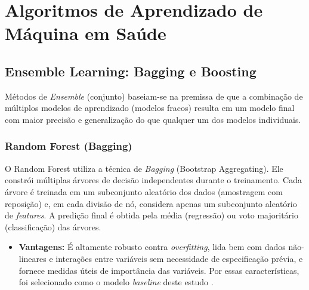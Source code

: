 \documentclass[12pt, a4paper]{report}
\begin{document}
\section{Algoritmos de Aprendizado de Máquina em Saúde}

\subsection{Ensemble Learning: Bagging e Boosting}
Métodos de \textit{Ensemble} (conjunto) baseiam-se na premissa de que a combinação de múltiplos modelos de aprendizado (modelos fracos) resulta em um modelo final com maior precisão e generalização do que qualquer um dos modelos individuais.

\subsubsection{Random Forest (Bagging)}
O Random Forest utiliza a técnica de \textit{Bagging} (Bootstrap Aggregating). Ele constrói múltiplas árvores de decisão independentes durante o treinamento. Cada árvore é treinada em um subconjunto aleatório dos dados (amostragem com reposição) e, em cada divisão de nó, considera apenas um subconjunto aleatório de \textit{features}. A predição final é obtida pela média (regressão) ou voto majoritário (classificação) das árvores.
\begin{itemize}
    \item \textbf{Vantagens:} É altamente robusto contra \textit{overfitting}, lida bem com dados não-lineares e interações entre variáveis sem necessidade de especificação prévia, e fornece medidas úteis de importância das variáveis. Por essas características, foi selecionado como o modelo \textit{baseline} deste estudo \citep{breiman2001random}.
\end{itemize}
\end{document}
